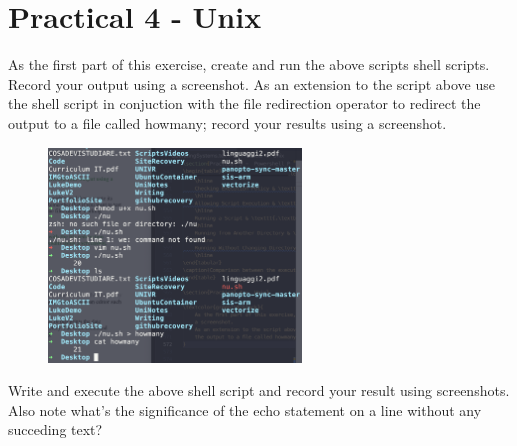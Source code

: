 \documentclass[a4paper]{article}
\begin{document}
\section{Practical 4 -  Unix}

\textcolor{green!50!black}{
    As the first part of this exercise, create and run the above scripts shell scripts. Record your output using
    a screenshot. 
    As an extension to the script above use the shell script in conjuction with the file redirection operator to redirect
    the output to a file called howmany; record your results using a screenshot.
}

\begin{figure}[H]
    \centering
    \includegraphics[width=0.6\textwidth]{pract4ex12.png}
\end{figure}
\noindent
\textcolor{green!50!black}{
   Write and execute the above shell script and record your result using screenshots. Also note what's the significance of the
   echo statement on a line without any succeding text?
}
\end{document}
